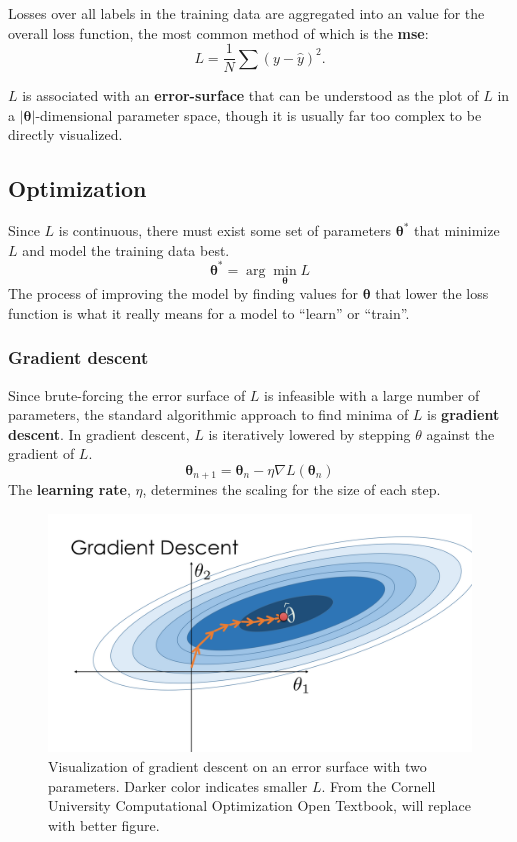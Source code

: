 \documentclass[12pt]{report}
\theoremstyle{definition}
\theoremstyle{remark}
\begin{document}
Losses over all labels in the training data are aggregated into an value for the overall loss function, the most common method of which is the \textbf{\gls{mse}}:
\begin{equation}
    L = \frac{1}{N}\sum (y - \hat{y})^2 .
\end{equation}

$L$ is associated with an \textbf{\gls{error-surface}} that can be understood as the plot of $L$ in a $|\mathbf{\theta}|$-dimensional parameter space, though it is usually far too complex to be directly visualized.

\subsection{Optimization}

Since $L$ is continuous, there must exist some set of parameters $\mathbf{\theta}^\ast$ that minimize $L$ and model the training data best.
\begin{equation}
    \mathbf{\theta}^\ast = \arg\min_{\mathbf{\theta}} L
\end{equation}
The process of improving the model by finding values for $\mathbf{\theta}$ that lower the loss function is what it really means for a model to ``learn'' or ``train''.

\subsubsection{Gradient descent}

Since brute-forcing the error surface of $L$ is infeasible with a large number of parameters, the standard algorithmic approach to find minima of $L$ is \textbf{gradient descent}. In gradient descent, $L$ is iteratively lowered by stepping $\theta$ against the gradient of $L$.
\begin{equation}
    \mathbf{\theta}_{n+1} = \mathbf{\theta}_n-\eta\nabla L(\mathbf{\theta}_n)
\end{equation}
The \textbf{learning rate}, $\eta$, determines the scaling for the size of each step.

\begin{figure}[h]
    \centering
    \includegraphics[width=0.7\linewidth]{figs/gradient_descent.png}
    \caption{Visualization of gradient descent on an error surface with two parameters. Darker color indicates smaller $L$. From the Cornell University Computational Optimization Open Textbook, will replace with better figure.}
    \label{fig:enter-label}
\end{figure}
\end{document}
